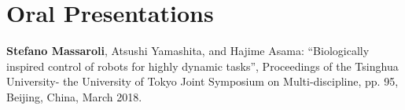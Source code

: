 \section*{Oral Presentations}
\begin{enumerate}[{[}o1{]}]
	\item \textbf{Stefano Massaroli}, Atsushi Yamashita, and Hajime Asama: ``Biologically inspired control of robots for highly dynamic tasks'', Proceedings of the Tsinghua University- the University of Tokyo
	Joint Symposium on Multi-discipline, pp. 95, Beijing, China, March 2018.
\end{enumerate}